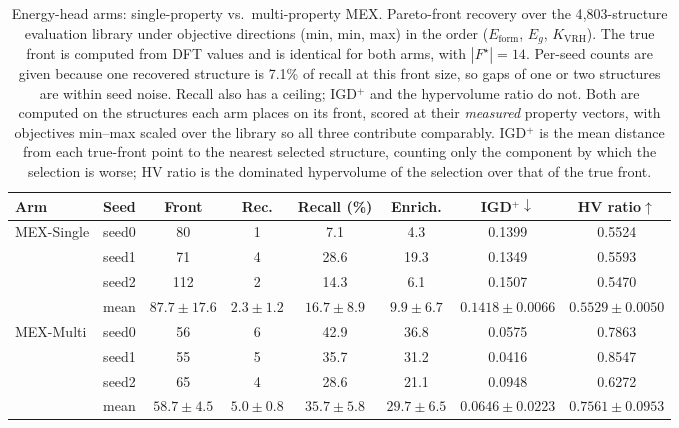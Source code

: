 \begin{table}[htbp]
\renewcommand{\arraystretch}{1.2}
\setlength{\tabcolsep}{4pt}
\caption{Energy-head arms: single-property vs.\ multi-property MEX. Pareto-front recovery over the 4{,}803-structure evaluation library under objective directions (min, min, max) in the order ($E_\mathrm{form}$, $E_g$, $K_\mathrm{VRH}$). The true front is computed from DFT values and is identical for both arms, with $|F^\star|{=}14$. Per-seed counts are given because one recovered structure is 7.1\% of recall at this front size, so gaps of one or two structures are within seed noise. Recall also has a ceiling; IGD$^+$ and the hypervolume ratio do not. Both are computed on the structures each arm places on its front, scored at their \emph{measured} property vectors, with objectives min--max scaled over the library so all three contribute comparably. IGD$^+$ is the mean distance from each true-front point to the nearest selected structure, counting only the component by which the selection is worse; HV ratio is the dominated hypervolume of the selection over that of the true front.}
\label{tab:pareto_arms_mex_heldout_min_min_max}
\centering
\footnotesize
\begin{tabular}{@{}llcccccc@{}}
\hline\hline
\textbf{Arm} & \textbf{Seed} & \textbf{Front} & \textbf{Rec.} & \textbf{Recall (\%)} & \textbf{Enrich.} & \textbf{IGD$^+\downarrow$} & \textbf{HV ratio$\uparrow$} \\
\hline
\multirow{4}{*}{MEX-Single}
  & seed0 & 80 & 1 & 7.1 & 4.3 & 0.1399 & 0.5524 \\
  & seed1 & 71 & 4 & 28.6 & 19.3 & 0.1349 & 0.5593 \\
  & seed2 & 112 & 2 & 14.3 & 6.1 & 0.1507 & 0.5470 \\
  & mean & $87.7 \pm 17.6$ & $2.3 \pm 1.2$ & $16.7 \pm 8.9$ & $9.9 \pm 6.7$ & $0.1418 \pm 0.0066$ & $0.5529 \pm 0.0050$ \\
\hline
\multirow{4}{*}{MEX-Multi}
  & seed0 & 56 & 6 & 42.9 & 36.8 & 0.0575 & 0.7863 \\
  & seed1 & 55 & 5 & 35.7 & 31.2 & 0.0416 & 0.8547 \\
  & seed2 & 65 & 4 & 28.6 & 21.1 & 0.0948 & 0.6272 \\
  & mean & $58.7 \pm 4.5$ & $5.0 \pm 0.8$ & $35.7 \pm 5.8$ & $29.7 \pm 6.5$ & $0.0646 \pm 0.0223$ & $0.7561 \pm 0.0953$ \\
\hline\hline
\end{tabular}
\end{table}

